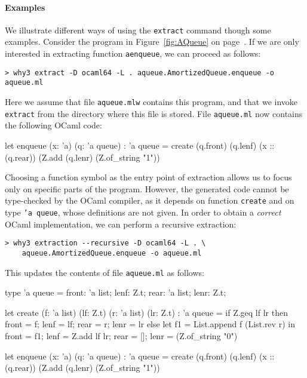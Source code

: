 \paragraph{Examples}
We illustrate different ways of using the \texttt{extract} command though some
examples. Consider the program in Figure~\ref{fig:AQueue} on
page~\pageref{fig:AQueue}. If we are only interested in extracting function
\texttt{aenqueue}, we can proceed as follows:
\begin{verbatim}
> why3 extract -D ocaml64 -L . aqueue.AmortizedQueue.enqueue -o aqueue.ml
\end{verbatim}
Here we assume that file \texttt{aqueue.mlw} contains this program, and that
we invoke \texttt{extract} from the directory where this file is stored. File
\texttt{aqueue.ml} now contains the following OCaml code:
\begin{whycode}
let enqueue (x: 'a) (q: 'a queue) : 'a queue =
create (q.front) (q.lenf) (x :: (q.rear))
       (Z.add (q.lenr) (Z.of_string "1"))
\end{whycode}
Choosing a function symbol as the entry point of extraction allows us to focus
only on specific parts of the program. However, the generated code cannot be
type-checked by the OCaml compiler, as it depends on function \texttt{create}
and on type \texttt{'a queue}, whose definitions are not given. In order to
obtain a \emph{correct} OCaml implementation, we can perform a recursive
extraction:
\begin{verbatim}
> why3 extraction --recursive -D ocaml64 -L . \
    aqueue.AmortizedQueue.enqueue -o aqueue.ml
\end{verbatim}
This updates the contents of file \texttt{aqueue.ml} as follows:
\begin{whycode}
type 'a queue = {
  front: 'a list;
  lenf: Z.t;
  rear: 'a list;
  lenr: Z.t;
  }

let create (f: 'a list) (lf: Z.t) (r: 'a list) (lr: Z.t) : 'a queue =
  if Z.geq lf lr
  then
    { front = f; lenf = lf; rear = r; lenr = lr }
  else
    let f1 = List.append f (List.rev r) in
    { front = f1; lenf = Z.add lf lr; rear = []; lenr = (Z.of_string "0") }

let enqueue (x: 'a) (q: 'a queue) : 'a queue =
  create (q.front) (q.lenf) (x :: (q.rear))
    (Z.add (q.lenr) (Z.of_string "1"))
\end{whycode}

